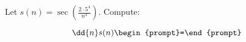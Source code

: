 \documentclass{ximera}
\author{Bart Snapp\and Nela Lakos}
\begin{document}
\begin{exercise}
Let $s(n) = \sec {\left(\frac{2 \cdot5^{4}}{{n^{3}}}\right)}$. Compute:

\[
\dd{n}s(n)
\begin{prompt}=\end{prompt}
\]
\end{exercise}
\end{document}
